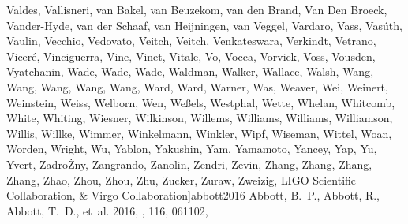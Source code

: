 \documentclass[times,tight]{aastex631}
\begin{document}
\begin{thebibliography}{}
{  {Valdes}, {Vallisneri}, {van Bakel}, {van Beuzekom}, {van den Brand}, {Van
  Den Broeck}, {Vander-Hyde}, {van der Schaaf}, {van Heijningen}, {van Veggel},
  {Vardaro}, {Vass}, {Vas{\'u}th}, {Vaulin}, {Vecchio}, {Vedovato}, {Veitch},
  {Veitch}, {Venkateswara}, {Verkindt}, {Vetrano}, {Vicer{\'e}}, {Vinciguerra},
  {Vine}, {Vinet}, {Vitale}, {Vo}, {Vocca}, {Vorvick}, {Voss}, {Vousden},
  {Vyatchanin}, {Wade}, {Wade}, {Wade}, {Waldman}, {Walker}, {Wallace},
  {Walsh}, {Wang}, {Wang}, {Wang}, {Wang}, {Wang}, {Ward}, {Ward}, {Warner},
  {Was}, {Weaver}, {Wei}, {Weinert}, {Weinstein}, {Weiss}, {Welborn}, {Wen},
  {We{\ss}els}, {Westphal}, {Wette}, {Whelan}, {Whitcomb}, {White}, {Whiting},
  {Wiesner}, {Wilkinson}, {Willems}, {Williams}, {Williams}, {Williamson},
  {Willis}, {Willke}, {Wimmer}, {Winkelmann}, {Winkler}, {Wipf}, {Wiseman},
  {Wittel}, {Woan}, {Worden}, {Wright}, {Wu}, {Yablon}, {Yakushin}, {Yam},
  {Yamamoto}, {Yancey}, {Yap}, {Yu}, {Yvert}, {Zadro{\.Z}ny}, {Zangrando},
  {Zanolin}, {Zendri}, {Zevin}, {Zhang}, {Zhang}, {Zhang}, {Zhang}, {Zhao},
  {Zhou}, {Zhou}, {Zhu}, {Zucker}, {Zuraw}, {Zweizig}, {LIGO Scientific
  Collaboration}, \& {Virgo Collaboration}}]{abbott2016}
{Abbott}, B.~P., {Abbott}, R., {Abbott}, T.~D., {et~al.} 2016, \prl, 116,
  061102, 


\end{thebibliography}
\end{document}
